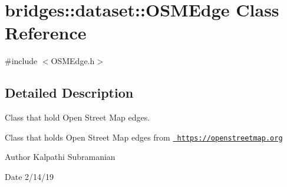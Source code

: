 \hypertarget{classbridges_1_1dataset_1_1_o_s_m_edge}{}\section{bridges\+::dataset\+::O\+S\+M\+Edge Class Reference}
\label{classbridges_1_1dataset_1_1_o_s_m_edge}


{\ttfamily \#include $<$O\+S\+M\+Edge.\+h$>$}



\subsection{Detailed Description}
Class that hold Open Street Map edges. 

Class that holds Open Street Map edges from \href{https://openstreetmap.org}{\texttt{ https\+://openstreetmap.\+org}}

\begin{DoxyAuthor}{Author}
Kalpathi Subramanian 
\end{DoxyAuthor}
\begin{DoxyDate}{Date}
2/14/19 
\end{DoxyDate}
